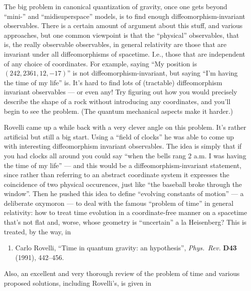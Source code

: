 \documentclass[12pt]{article}
\def\tightlist{}
\begin{document}
The big problem in canonical quantization of gravity, once one gets
beyond ``mini-'' and ``midisuperspace'' models, is to find enough
diffeomorphism-invariant observables. There is a certain amount of
argument about this stuff, and various approaches, but one common
viewpoint is that the ``physical'' observables, that is, the really
observable observables, in general relativity are those that are
invariant under all diffeomorphisms of spacetime. I.e., those that are
independent of any choice of coordinates. For example, saying ``My
position is \((242,2361,12,-17)\)'' is not diffeomorphism-invariant, but
saying ``I'm having the time of my life'' is. It's hard to find lots of
(tractable) diffeomorphism invariant observables --- or even any! Try
figuring out how you would precisely describe the shape of a rock
without introducing any coordinates, and you'll begin to see the
problem. (The quantum mechanical aspects make it harder.)

Rovelli came up a while back with a very clever angle on this problem.
It's rather artificial but still a big start. Using a ``field of
clocks'' he was able to come up with interesting diffeomorphism
invariant observables. The idea is simply that if you had clocks all
around you could say ``when the bells rang 2 a.m. I was having the time
of my life'' --- and this would be a diffeomorphism-invariant statement,
since rather than referring to an abstract coordinate system it
expresses the coincidence of two physical occurences, just like ``the
baseball broke through the window''. Then he pushed this idea to define
``evolving constants of motion'' --- a deliberate oxymoron --- to deal
with the famous ``problem of time'' in general relativity: how to treat
time evolution in a coordinate-free manner on a spacetime that's not
flat and, worse, whose geometry is ``uncertain'' a la Heisenberg? This
is treated, by the way, in

\begin{enumerate}
\def\labelenumi{\arabic{enumi})}
\setcounter{enumi}{2}
\tightlist
\item
  Carlo Rovelli, ``Time in quantum gravity: an hypothesis'', \emph{Phys.\
  Rev.} \textbf{D43} (1991), 442--456.
\end{enumerate}

Also, an excellent and very thorough review of the problem of time and
various proposed solutions, including Rovelli's, is given in
\end{document}
